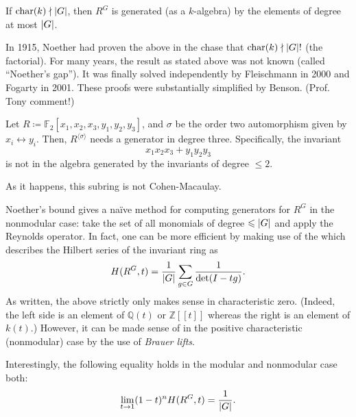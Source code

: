 \documentclass[12pt]{article}
\begin{document}
\begin{thm}
	If $\operatorname{char}(k) \nmid {\left\lvert G \right\lvert}$, then $R^{G}$ is generated (as a $k$-algebra) by the elements of degree at most ${\left\lvert G \right\lvert}$.
\end{thm}
In 1915, Noether had proven the above in the chase that $\operatorname{char}(k) \nmid {\left\lvert G \right\lvert}!$ (the factorial). For many years, the result as stated above was not known (called ``Noether's gap''). It was finally solved independently by Fleischmann in 2000 and Fogarty in 2001. These proofs were substantially simplified by Benson. \hfill {\color{purple}(Prof. Tony comment!)}

\begin{ex} \phantom{h} \newline
	Let $R \coloneqq \mathbb{F}_{2}[x_{1}, x_{2}, x_{3}, y_{1}, y_{2}, y_{3}]$, and $\sigma$ be the order two automorphism given by $x_{i} \leftrightarrow y_{i}$. \newline
	Then, $R^{\langle \sigma \rangle}$ needs a generator in degree three. Specifically, the invariant
	\begin{equation*} 
		x_{1} x_{2} x_{3} + y_{1} y_{2} y_{3}
	\end{equation*}
	is not in the algebra generated by the invariants of degree $\le 2$. 

	As it happens, this subring is not Cohen-Macaulay.
\end{ex}

Noether's bound gives a na\"ive method for computing generators for $R^{G}$ in the nonmodular case: take the set of all monomials of degree $\leqslant {\left\lvert G \right\lvert}$ and apply the Reynolds operator. \newline
In fact, one can be more efficient by making use of the  which describes the Hilbert series of the invariant ring as
\begin{equation*} 
	H(R^{G}, t) = \frac{1}{{\left\lvert G \right\lvert}} \sum_{g \in G} \dfrac{1}{\det(I - tg)}.
\end{equation*}
As written, the above strictly only makes sense in characteristic zero. (Indeed, the left side is an element of $\mathbb{Q}(t)$ or $\mathbb{Z}[\![t]\!]$ whereas the right is an element of $k(t)$.) However, it can be made sense of in the positive characteristic (nonmodular) case by the use of \emph{Brauer lifts}.

Interestingly, the following equality holds in the modular and nonmodular case both:
\begin{equation*} 
	\lim_{t \to 1} (1 - t)^{n} H(R^{G}, t) = \frac{1}{{\left\lvert G \right\lvert}}.
\end{equation*}
\end{document}
